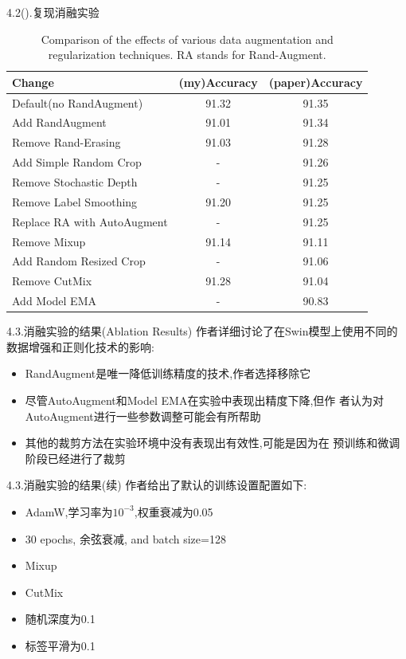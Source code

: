 \documentclass[UTF8]{ctexbeamer}
\begin{document}
\begin{frame}{4.2(\ast).复现消融实验}
  \begin{table}[h]
    \centering
    \caption{Comparison of the effects of various data augmentation and regularization techniques. RA stands for Rand-Augment.}
    \begin{tabular}{|l|c|c|}
    \hline
    \textbf{Change} & \textbf{(my)Accuracy} & \textbf{(paper)Accuracy} \\
    \hline
    Default(no RandAugment) & 91.32 & 91.35\\
    Add RandAugment & 91.01 & 91.34\\
    Remove Rand-Erasing & 91.03 & 91.28 \\
    Add Simple Random Crop & - & 91.26\\
    Remove Stochastic Depth & - & 91.25\\
    Remove Label Smoothing & 91.20 & 91.25\\
    Replace RA with AutoAugment & - & 91.25\\
    Remove Mixup & 91.14 & 91.11\\
    Add Random Resized Crop & - & 91.06\\
    Remove CutMix & 91.28 & 91.04\\
    Add Model EMA & - & 90.83\\
    \hline
    \end{tabular}
  \end{table}  
\end{frame}

\begin{frame}{4.3.消融实验的结果(Ablation Results)}
  作者详细讨论了在Swin模型上使用不同的数据增强和正则化技术的影响:
  \begin{itemize}
    \item RandAugment是唯一降低训练精度的技术,作者选择移除它
    \item 尽管AutoAugment和Model EMA在实验中表现出精度下降,但作
    者认为对AutoAugment进行一些参数调整可能会有所帮助
    \item 其他的裁剪方法在实验环境中没有表现出有效性,可能是因为在
    预训练和微调阶段已经进行了裁剪
  \end{itemize}
\end{frame}

\begin{frame}{4.3.消融实验的结果(续)}
  作者给出了默认的训练设置配置如下:
  \begin{itemize}
    \item AdamW,学习率为$10^{-3}$,权重衰减为0.05
    \item 30 epochs, 余弦衰减, and batch size=128
    \item Mixup
    \item CutMix
    \item 随机深度为0.1
    \item 标签平滑为0.1
  \end{itemize}
\end{frame}
\end{document}
